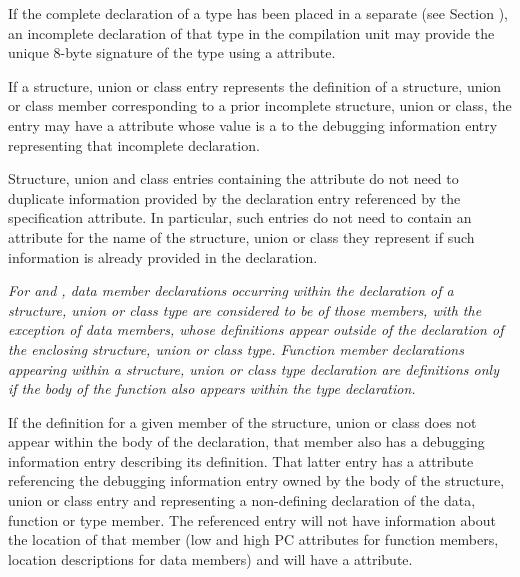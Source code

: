 If the complete declaration of a type has been placed
in\hypertarget{chap:DWATsignaturetypesignature}{}
a separate 
(see Section ),
an incomplete declaration
of that type in the compilation unit may provide
the unique 8-byte signature of the type using a
\DWATsignatureDEFN{} attribute.

If a structure, union or class entry represents the definition
of a structure, union or class member corresponding to a prior
incomplete structure, union or class, the entry may have a
\DWATspecification{} attribute
whose value is a  to
the debugging information entry representing that incomplete
declaration.

Structure, union and class entries containing the
\DWATspecification{} attribute
do not need to duplicate
information provided by the declaration entry referenced by the
specification attribute.  In particular, such entries do not
need to contain an attribute for the name of the structure,
union or class they represent if such information is already
provided in the declaration.

\textit{For  and ,
data
member declarations occurring within
the declaration of a structure, union or class type are
considered to be  of those members, with
the exception of  data members, whose definitions
appear outside of the declaration of the enclosing structure,
union or class type. Function member declarations appearing
within a structure, union or class type declaration are
definitions only if the body of the function also appears
within the type declaration.}

If the definition for a given member of the structure, union
or class does not appear within the body of the declaration,
that member also has a debugging information entry describing
its definition. That latter entry has a
\DWATspecification{} attribute
referencing the debugging information entry
owned by the body of the structure, union or class entry and
representing a non-defining declaration of the data, function
or type member. The referenced entry will not have information
about the location of that member (low and high PC attributes
for function members, location descriptions for data members)
and will have a \DWATdeclaration{} attribute.

